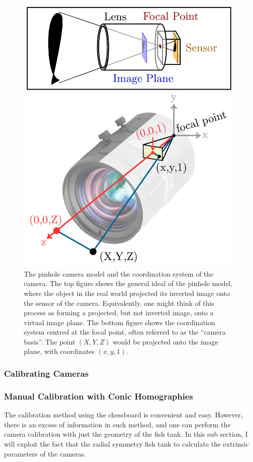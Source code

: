 \documentclass[11pt,twoside]{report}
\begin{document}
\begin{figure}
  \includegraphics[width=0.6\linewidth,outer]{camera-model}
  \caption{The pinhole camera model and the coordination system of the camera. The top figure shows the general ideal of the pinhole model, where the object in the real world projected its inverted image onto the sensor of the camera. Equivalently, one might think of this process as forming a projected, but not inverted image, onto a virtual image plane. The bottom figure shows the coordination system centred at the focal point, often referred to as the ``camera basis''. The point $(X, Y, Z)$ would be projected onto the image plane, with coordinates $(x, y, 1)$.}
  \label{fig:camera_model}
\end{figure}

\subsubsection{Calibrating Cameras}

\subsubsection{Manual Calibration with Conic Homographies}

The calibration method using the chessboard is convenient and easy. However, there is an excess of information in such method, and one can perform the camera calibration with just the geometry of the fish tank. In this sub section, I will exploit the fact that the radial symmetry fish tank to calculate the extrinsic parameters of the cameras.
\end{document}
